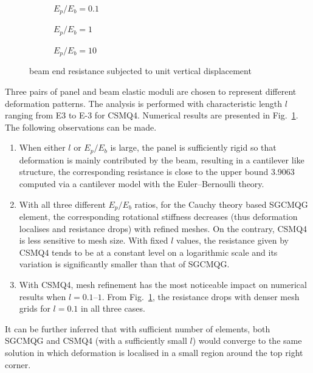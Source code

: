 \documentclass[3p,sort&compress,11pt,fleqn,review]{elsarticle}
\newcommand*{\figref}[1]{Fig.~\ref{#1}}
\begin{document}
\begin{figure}[ht]
\centering\footnotesize
\begin{subfigure}[b]{.99\textwidth}\centering

\caption{$E_p/E_b=0.1$}
\end{subfigure}
\begin{subfigure}[b]{.99\textwidth}\centering

\caption{$E_p/E_b=1$}
\end{subfigure}
\begin{subfigure}[b]{.99\textwidth}\centering

\caption{$E_p/E_b=10$}
\end{subfigure}
\caption{beam end resistance subjected to unit vertical displacement}\label{fig:joint}
\end{figure}
Three pairs of panel and beam elastic moduli are chosen to represent different deformation patterns. The analysis is performed with characteristic length $l$ ranging from \num[print-unity-mantissa=false]{E3} to \num[print-unity-mantissa=false]{E-3} for CSMQ4. Numerical results are presented in \figref{fig:joint}. The following observations can be made.
\begin{enumerate}
\item When either $l$ or $E_p/E_b$ is large, the panel is sufficiently rigid so that deformation is mainly contributed by the beam, resulting in a cantilever like structure, the corresponding resistance is close to the upper bound \num{3.9063} computed via a cantilever model with the Euler--Bernoulli theory.
\item With all three different $E_p/E_b$ ratios, for the Cauchy theory based SGCMQG element, the corresponding rotational stiffness decreases (thus deformation localises and resistance drops) with refined meshes. On the contrary, CSMQ4 is less sensitive to mesh size. With fixed $l$ values, \alert{the resistance given by CSMQ4 tends to be at a constant level on a logarithmic scale and its variation} is significantly smaller than that of SGCMQG.
\item With CSMQ4, mesh refinement has the most noticeable impact on numerical results when $l=\numrange{0.1}{1}$. \alert{From \figref{fig:joint}, the resistance drops with denser mesh grids for $l=0.1$ in all three cases.}
\end{enumerate}

It can be further inferred that with sufficient number of elements, both SGCMQG and CSMQ4 (with a sufficiently small $l$) would converge to the same solution in which deformation is localised in a small region around the top right corner.
\end{document}
